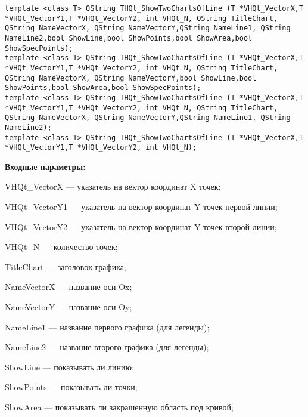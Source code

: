 \documentclass[a4paper,12pt]{article}
\begin{document}
\begin{lstlisting}[label=code_syntax_THQt_ShowTwoChartsOfLine,caption=Синтаксис]
template <class T> QString THQt_ShowTwoChartsOfLine (T *VHQt_VectorX,T *VHQt_VectorY1,T *VHQt_VectorY2, int VHQt_N, QString TitleChart, QString NameVectorX, QString NameVectorY,QString NameLine1, QString NameLine2,bool ShowLine,bool ShowPoints,bool ShowArea,bool ShowSpecPoints);
template <class T> QString THQt_ShowTwoChartsOfLine (T *VHQt_VectorX,T *VHQt_VectorY1,T *VHQt_VectorY2, int VHQt_N, QString TitleChart, QString NameVectorX, QString NameVectorY,bool ShowLine,bool ShowPoints,bool ShowArea,bool ShowSpecPoints);
template <class T> QString THQt_ShowTwoChartsOfLine (T *VHQt_VectorX,T *VHQt_VectorY1,T *VHQt_VectorY2, int VHQt_N, QString TitleChart, QString NameVectorX, QString NameVectorY,QString NameLine1, QString NameLine2);
template <class T> QString THQt_ShowTwoChartsOfLine (T *VHQt_VectorX,T *VHQt_VectorY1,T *VHQt_VectorY2, int VHQt_N);
\end{lstlisting}

\textbf{Входные параметры:}
 
    VHQt\_VectorX --- указатель на вектор координат X точек;
 
    VHQt\_VectorY1 --- указатель на вектор координат Y точек первой линии;
 
    VHQt\_VectorY2 --- указатель на вектор координат Y точек второй линии;
 
    VHQt\_N --- количество точек;
 
    TitleChart --- заголовок графика;
 
    NameVectorX --- название оси Ox;
 
    NameVectorY --- название оси Oy;
 
    NameLine1 --- название первого графика (для легенды);
 
    NameLine2 --- название второго графика (для легенды);
 
    ShowLine --- показывать ли линию;
 
    ShowPoints --- показывать ли точки;
 
    ShowArea --- показывать ли закрашенную область под кривой;
 
    ShowSpecPoints --- показывать ли специальные точки.

\textbf{Возвращаемое значение:}

Строка с HTML кодами с выводимым графиком.

\textbf{Примечание:}

Используются случайные числа, так что рекомендуется вызвать в программе иницилизатор случайных чисел qsrand. Рекомендую так: qsrand(QDateTime::currentMSecsSinceEpoch () %
\end{document}
